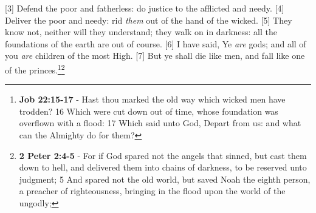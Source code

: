 [3] \textcolor[cmyk]{0.99998,1,0,0}{Defend the poor and fatherless: do justice to the afflicted and needy.}
[4] \textcolor[cmyk]{0.99998,1,0,0}{Deliver the poor and needy: rid \emph{them} out of the hand of the wicked.}
[5] \textcolor[cmyk]{0.99998,1,0,0}{They know not, neither will they understand; they walk on in darkness: all the foundations of the earth are out of course.}
[6] \textcolor[cmyk]{0.99998,1,0,0}{I have said, Ye \emph{are} gods; and all of you \emph{are} children of the most High.}
[7] \textcolor[cmyk]{0.99998,1,0,0}{But ye shall die like men, and fall like one of the princes.}\footnote{\textbf{Job 22:15-17} - Hast thou marked the old way which wicked men have trodden? 16 Which were cut down out of time, whose foundation was overflown with a flood: 17 Which said unto God, Depart from us: and what can the Almighty do for them?}\footnote{\textbf{2 Peter 2:4-5} - For if God spared not the angels that sinned, but cast them down to hell, and delivered them into chains of darkness, to be reserved unto judgment; 5 And spared not the old world, but saved Noah the eighth person, a preacher of righteousness, bringing in the flood upon the world of the ungodly;}%